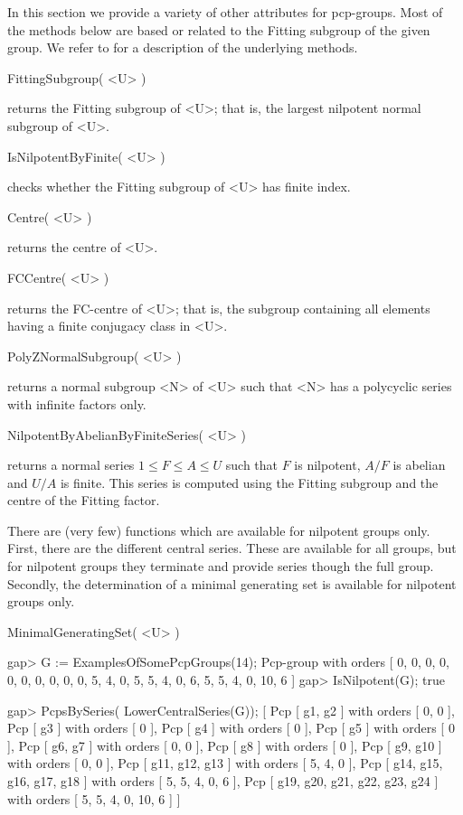 
In this section we provide a variety of other attributes for pcp-groups. Most
of the methods below are based or related to the Fitting subgroup of the given
group. We refer to \cite{Eic01} for a description of the underlying methods.  

\> FittingSubgroup( <U> )

returns the Fitting subgroup of <U>; that is, the largest nilpotent normal
subgroup of <U>.

\> IsNilpotentByFinite( <U> )

checks whether the Fitting subgroup of <U> has finite index. 

\> Centre( <U> )

returns the centre of <U>.

\> FCCentre( <U> )

returns the FC-centre of <U>; that is, the subgroup containing all elements
having a finite conjugacy class in <U>.

\> PolyZNormalSubgroup( <U> )

returns a normal subgroup <N> of <U> such that <N> has a polycyclic series
with infinite factors only.

\> NilpotentByAbelianByFiniteSeries( <U> )

returns a normal series $1 \leq F \leq A \leq U$ such that $F$ is nilpotent, 
$A/F$ is abelian and $U/A$ is finite. This series is computed using the
Fitting subgroup and the centre of the Fitting factor.


There are (very few) functions which are available for nilpotent groups only.
First, there are the different central series. These are available for all
groups, but for nilpotent groups they terminate and provide series though
the full group. Secondly, the determination of a minimal generating set is
available for nilpotent groups only.

\>MinimalGeneratingSet( <U> )

\beginexample
gap> G := ExamplesOfSomePcpGroups(14);
Pcp-group with orders [ 0, 0, 0, 0, 0, 0, 0, 0, 0, 0, 5, 4, 0, 5, 5, 4, 0, 6,
  5, 5, 4, 0, 10, 6 ]
gap> IsNilpotent(G);
true

gap> PcpsBySeries( LowerCentralSeries(G));
[ Pcp [ g1, g2 ] with orders [ 0, 0 ],
  Pcp [ g3 ] with orders [ 0 ],
  Pcp [ g4 ] with orders [ 0 ],
  Pcp [ g5 ] with orders [ 0 ],
  Pcp [ g6, g7 ] with orders [ 0, 0 ],
  Pcp [ g8 ] with orders [ 0 ],
  Pcp [ g9, g10 ] with orders [ 0, 0 ],
  Pcp [ g11, g12, g13 ] with orders [ 5, 4, 0 ],
  Pcp [ g14, g15, g16, g17, g18 ] with orders [ 5, 5, 4, 0, 6 ],
  Pcp [ g19, g20, g21, g22, g23, g24 ] with orders [ 5, 5, 4, 0, 10, 6 ] ]

